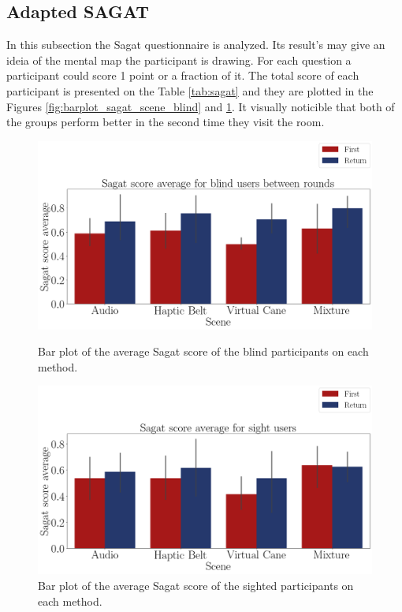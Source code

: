 \subsection{Adapted SAGAT}
\label{subsec:results_adapted_sagat}

In this subsection the Sagat questionnaire is analyzed. Its result's may give an ideia of the mental map the participant is drawing. For each question a participant could score 1 point or a fraction of it. The total score of each participant is presented on the Table \ref{tab:sagat} and they are plotted in the Figures \ref{fig:barplot_sagat_scene_blind} and \ref{fig:barplot_sagat_scene_sight}. It visually noticible that both of the groups perform better in the second time they visit the room.



\begin{figure}[!htb]
    \centering
    \begin{minipage}{\textwidth}
        \centering
        \includegraphics[width = 0.8\linewidth]{Resultados/Sagat/Figuras/png/barplot_sagat_avg_scene_blind.png}
        \caption{Bar plot of the average Sagat score of the blind participants on each method.}
        \label{fig:barplot_sagat_scene_blind}
    \end{minipage}
    \begin{minipage}{\textwidth}
        \centering
        \includegraphics[width = 0.8\linewidth]{Resultados/Sagat/Figuras/png/barplot_sagat_avg_scene_sight.png}
        \caption{Bar plot of the average Sagat score of the sighted participants on each method.}
        \label{fig:barplot_sagat_scene_sight}
    \end{minipage}
\end{figure}


